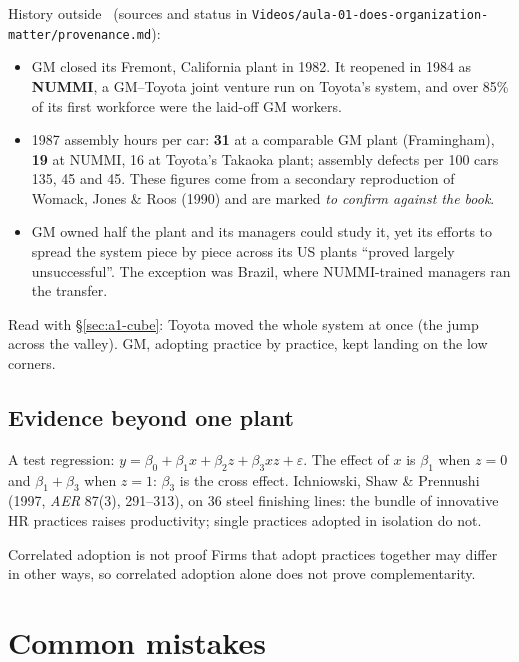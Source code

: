 History outside \MR\ (sources and status in
\texttt{Videos/\allowbreak aula-01-does-organization-matter/\allowbreak provenance.md}):

\begin{itemize}
  \item GM closed its Fremont, California plant in 1982. It reopened in 1984 as \textbf{NUMMI}, a
    GM--Toyota joint venture run on Toyota's system, and over 85\% of its first workforce were the
    laid-off GM workers.
  \item 1987 assembly hours per car: \textbf{31} at a comparable GM plant (Framingham),
    \textbf{19} at NUMMI, 16 at Toyota's Takaoka plant; assembly defects per 100 cars 135, 45 and
    45. These figures come from a secondary reproduction of Womack, Jones \& Roos (1990) and are
    marked \emph{to confirm against the book}.
  \item GM owned half the plant and its managers could study it, yet its efforts to spread the
    system piece by piece across its US plants ``proved largely unsuccessful''. The exception was
    Brazil, where NUMMI-trained managers ran the transfer.
\end{itemize}

Read with \S\ref{sec:a1-cube}: Toyota moved the whole system at once (the jump across the valley).
GM, adopting practice by practice, kept landing on the low corners.

\subsection{Evidence beyond one plant}\label{sec:a1-evidence}

A test regression: $y = \beta_0 + \beta_1 x + \beta_2 z + \beta_3 x z + \varepsilon$. The effect of
$x$ is $\beta_1$ when $z = 0$ and $\beta_1 + \beta_3$ when $z = 1$: $\beta_3$ is the cross effect.
Ichniowski, Shaw \& Prennushi (1997, \emph{AER} 87(3), 291--313), on 36 steel finishing lines: the
bundle of innovative HR practices raises productivity; single practices adopted in isolation do
not.

\begin{caution}{Correlated adoption is not proof}
Firms that adopt practices together may differ in other ways, so correlated adoption alone does
not prove complementarity.
\end{caution}

\section{Common mistakes}\label{sec:a1-mistakes}

